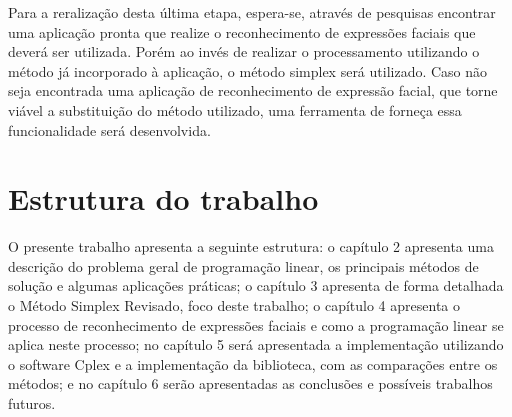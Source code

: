 Para a reralização desta última etapa, espera-se, através de pesquisas encontrar uma aplicação pronta que realize o reconhecimento de expressões faciais que deverá ser utilizada. Porém ao invés de realizar o processamento utilizando o método já incorporado à aplicação, o método simplex será utilizado. Caso não seja encontrada uma aplicação de reconhecimento de expressão facial, que torne viável a substituição do método utilizado, uma ferramenta de forneça essa funcionalidade será desenvolvida.

\section{Estrutura do trabalho}
O presente trabalho apresenta a seguinte estrutura: o capítulo 2 apresenta uma descrição do problema geral de programação linear, os principais métodos de solução e algumas aplicações práticas; o capítulo 3 apresenta de forma detalhada o Método Simplex Revisado, foco deste trabalho; o capítulo 4 apresenta o processo de reconhecimento de expressões faciais e como a programação linear se aplica neste processo; no capítulo 5 será apresentada a implementação utilizando o software Cplex e a implementação da biblioteca, com as comparações entre os métodos; e no capítulo 6 serão apresentadas as conclusões e possíveis trabalhos futuros. 
